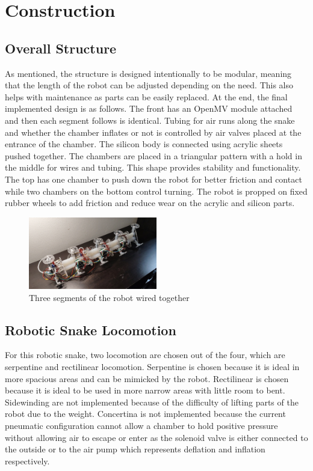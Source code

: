 \documentclass[twoside, 11pt]{article}
\begin{document}
\section{Construction}

\subsection{Overall Structure}
As mentioned, the structure is designed intentionally to be modular, meaning that the length of the robot can be adjusted depending on the need. This also helps with maintenance as parts can be easily replaced. At the end, the final implemented design is as follows. The front has an OpenMV module attached and then each segment follows is identical. Tubing for air runs along the snake and whether the chamber inflates or not is controlled by air valves placed at the entrance of the chamber. The silicon body is connected using acrylic sheets pushed together. The chambers are placed in a triangular pattern with a hold in the middle for wires and tubing. This shape provides stability and functionality. The top has one chamber to push down the robot for better friction and contact while two chambers on the bottom control turning. The robot is propped on fixed rubber wheels to add friction and reduce wear on the acrylic and silicon parts. 

\begin{figure} [H]
	\centering
	\includegraphics[width=0.5\textwidth]{completed_snake}
	\caption{Three segments of the robot wired together}
\end{figure}

\subsection{Robotic Snake Locomotion}
For this robotic snake, two locomotion are chosen out of the four, which are serpentine and rectilinear locomotion. Serpentine is chosen because it is ideal in more spacious areas and can be mimicked by the robot. Rectilinear is chosen because it is ideal to be used in more narrow areas with little room to bent. Sidewinding are not implemented because of the difficulty of lifting parts of the robot due to the weight. Concertina is not implemented because the current pneumatic configuration cannot allow a chamber to hold positive pressure without allowing air to escape or enter as the solenoid valve is either connected to the outside or to the air pump which represents deflation and inflation respectively. 
\end{document}
